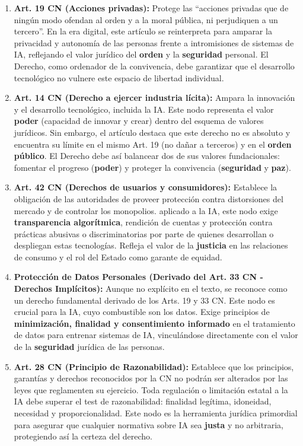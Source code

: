 \documentclass[10pt, a4paper]{article}
\begin{document}
\begin{enumerate}
    \item \textbf{Art. 19 CN (Acciones privadas):} Protege las ``acciones privadas que de ningún modo ofendan al orden y a la moral pública, ni perjudiquen a un tercero''. En la era digital, este artículo se reinterpreta para amparar la privacidad y autonomía de las personas frente a intromisiones de sistemas de IA, reflejando el valor jurídico del \textbf{orden} y la \textbf{seguridad} personal. El Derecho, como ordenador de la convivencia, debe garantizar que el desarrollo tecnológico no vulnere este espacio de libertad individual.

    \item \textbf{Art. 14 CN (Derecho a ejercer industria lícita):} Ampara la innovación y el desarrollo tecnológico, incluida la IA. Este nodo representa el valor \textbf{poder} (capacidad de innovar y crear) dentro del esquema de valores jurídicos. Sin embargo, el artículo destaca que este derecho no es absoluto y encuentra su límite en el mismo Art. 19 (no dañar a terceros) y en el \textbf{orden público}. El Derecho debe así balancear dos de sus valores fundacionales: fomentar el progreso (\textbf{poder}) y proteger la convivencia (\textbf{seguridad} y \textbf{paz}).

    \item \textbf{Art. 42 CN (Derechos de usuarios y consumidores):} Establece la obligación de las autoridades de proveer protección contra distorsiones del mercado y de controlar los monopolios. aplicado a la IA, este nodo exige \textbf{transparencia algorítmica}, rendición de cuentas y protección contra prácticas abusivas o discriminatorias por parte de quienes desarrollan o despliegan estas tecnologías. Refleja el valor de la \textbf{justicia} en las relaciones de consumo y el rol del Estado como garante de equidad.

    \item \textbf{Protección de Datos Personales (Derivado del Art. 33 CN - Derechos Implícitos):} Aunque no explícito en el texto, se reconoce como un derecho fundamental derivado de los Arts. 19 y 33 CN. Este nodo es crucial para la IA, cuyo combustible son los datos. Exige principios de \textbf{minimización, finalidad y consentimiento informado} en el tratamiento de datos para entrenar sistemas de IA, vinculándose directamente con el valor de la \textbf{seguridad} jurídica de las personas.

    \item \textbf{Art. 28 CN (Principio de Razonabilidad):} Establece que los principios, garantías y derechos reconocidos por la CN no podrán ser alterados por las leyes que reglamenten su ejercicio. Toda regulación o limitación estatal a la IA debe superar el test de razonabilidad: finalidad legítima, idoneidad, necesidad y proporcionalidad. Este nodo es la herramienta jurídica primordial para asegurar que cualquier normativa sobre IA sea \textbf{justa} y no arbitraria, protegiendo así la certeza del derecho.


\end{enumerate}
\end{document}
